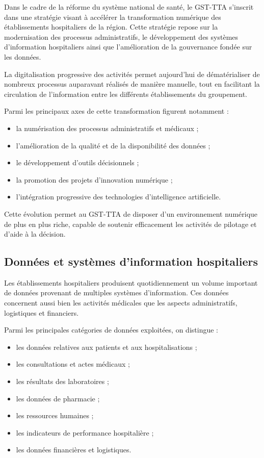 Dans le cadre de la réforme du système national de santé, le GST-TTA s'inscrit dans une stratégie visant à accélérer la transformation numérique des établissements hospitaliers de la région. Cette stratégie repose sur la modernisation des processus administratifs, le développement des systèmes d'information hospitaliers ainsi que l'amélioration de la gouvernance fondée sur les données.

La digitalisation progressive des activités permet aujourd'hui de dématérialiser de nombreux processus auparavant réalisés de manière manuelle, tout en facilitant la circulation de l'information entre les différents établissements du groupement.

Parmi les principaux axes de cette transformation figurent notamment :

\begin{itemize}
  \item la numérisation des processus administratifs et médicaux ;
  \item l'amélioration de la qualité et de la disponibilité des données ;
  \item le développement d'outils décisionnels ;
  \item la promotion des projets d'innovation numérique ;
  \item l'intégration progressive des technologies d'intelligence artificielle.
\end{itemize}

Cette évolution permet au GST-TTA de disposer d'un environnement numérique de plus en plus riche, capable de soutenir efficacement les activités de pilotage et d'aide à la décision.

\subsection{Données et systèmes d'information hospitaliers}

Les établissements hospitaliers produisent quotidiennement un volume important de données provenant de multiples systèmes d'information. Ces données concernent aussi bien les activités médicales que les aspects administratifs, logistiques et financiers.

Parmi les principales catégories de données exploitées, on distingue :

\begin{itemize}
  \item les données relatives aux patients et aux hospitalisations ;
  \item les consultations et actes médicaux ;
  \item les résultats des laboratoires ;
  \item les données de pharmacie ;
  \item les ressources humaines ;
  \item les indicateurs de performance hospitalière ;
  \item les données financières et logistiques.
\end{itemize}

